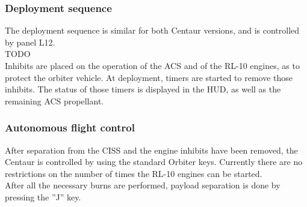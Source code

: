 \documentclass[Space_Shuttle_Ultra_Manual.tex]{subfiles}
\begin{document}
\begin{multicols*}{2}
\subsubsection{Deployment sequence}
The deployment sequence is similar for both Centaur versions, and is controlled by panel L12.
\\
TODO
\\
Inhibits are placed on the operation of the ACS and of the RL-10 engines, as to protect the orbiter vehicle. At deployment, timers are started to remove those inhibits. The status of those timers is displayed in the HUD, as well as the remaining ACS propellant.

\subsubsection{Autonomous flight control}
After separation from the CISS and the engine inhibits have been removed, the Centaur is controlled by using the standard Orbiter keys. Currently there are no restrictions on the number of times the RL-10 engines can be started.
\\
After all the necessary burns are performed, payload separation is done by pressing the ''J'' key.

\end{multicols*}

\newpage
\end{document}
